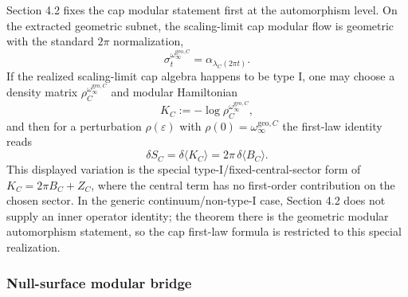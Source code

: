 Section 4.2 fixes the cap modular statement first at the automorphism level. On the extracted geometric subnet, the scaling-limit cap modular flow is geometric with the standard \(2\pi\) normalization,
\[
\sigma_t^{\omega_\infty^{\mathrm{geo},C}}
=
\alpha_{\lambda_C(2\pi t)}.
\]
If the realized scaling-limit cap algebra happens to be type I, one may choose a density matrix \(\rho_C^{\omega_\infty^{\mathrm{geo},C}}\) and modular Hamiltonian
\[
K_C:=-\log\rho_C^{\omega_\infty^{\mathrm{geo},C}},
\]
and then for a perturbation \(\rho(\varepsilon)\) with \(\rho(0)=\omega_\infty^{\mathrm{geo},C}\) the first-law identity reads
\[
\delta S_C=\delta\langle K_C\rangle
=
2\pi\,\delta\langle B_C\rangle.
\]
This displayed variation is the special type-I/fixed-central-sector form of
\(K_C=2\pi B_C+Z_C\), where the central term has no first-order contribution on the chosen
sector. In the generic continuum/non-type-I case, Section 4.2 does not supply an inner operator
identity; the theorem there is the geometric modular automorphism statement, so the cap
first-law formula is restricted to this special realization.

\subsubsection{Null-surface modular bridge}\label{52-null-surface-modular-bridge}

